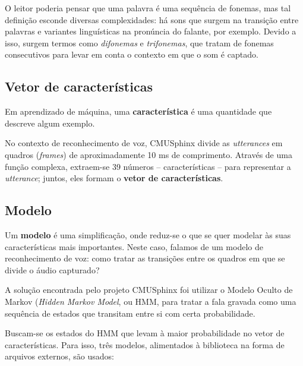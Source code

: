 O leitor poderia pensar que uma palavra é uma sequência de fonemas, mas tal definição esconde diversas complexidades: há sons que surgem na transição entre palavras e variantes linguísticas na pronúncia do falante, por exemplo. Devido a isso, surgem termos como \textit{difonemas} e \textit{trifonemas}, que tratam de fonemas consecutivos para levar em conta o contexto em que o som é captado.


\subsection{Vetor de características}

Em aprendizado de máquina, uma \textbf{característica} é uma quantidade que descreve algum exemplo.

No contexto de reconhecimento de voz, CMUSphinx divide as \textit{utterances} em quadros (\textit{frames}) de aproximadamente 10 ms de comprimento. Através de uma função complexa, extraem-se 39 números -- características -- para representar a \textit{utterance}; juntos, eles formam o \textbf{vetor de características}.


\subsection{Modelo}
\label{pocketsphinx-models}

Um \textbf{modelo} é uma simplificação, onde reduz-se o que se quer modelar às suas características mais importantes. Neste caso, falamos de um modelo de reconhecimento de voz: como tratar as transições entre os quadros em que se divide o áudio capturado?

A solução encontrada pelo projeto CMUSphinx foi utilizar o Modelo Oculto de Markov (\textit{Hidden Markov Model}, ou HMM, \iffalse conforme visto na seção \ref{cap:hmm})\fi para tratar a fala gravada como uma sequência de estados que transitam entre si com certa probabilidade.

Buscam-se os estados do HMM que levam à maior probabilidade no vetor de características. Para isso, três modelos, alimentados à biblioteca na forma de arquivos externos, são usados:


